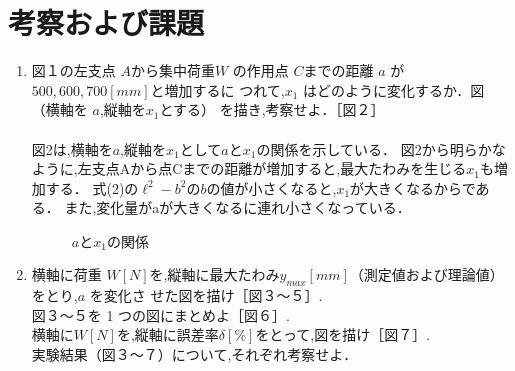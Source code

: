 \documentclass[a4paper,12pt]{jsarticle}
\begin{document}
\section{考察および課題}
\begin{enumerate}
  \item 図１の左支点 $A$から集中荷重$ W$ の作用点 $C $までの距離 $a$ が $500,600,700 [mm]$と増加するに
  つれて,$x_1$ はどのように変化するか．図（横軸を $a $,縦軸を$x_1$とする） を描き,考察せよ．［図２］\\
  \\
  \quad 図2は,横軸を$a$,縦軸を$x_1$として$a$と$x_1$の関係を示している．
  図2から明らかなように,左支点Aから点Cまでの距離が増加すると,最大たわみを生じる$x_1$も増加する．
  式(2)の$\ell^2-b^2$の$b$の値が小さくなると,$x_1$が大きくなるからである．
  また,変化量がaが大きくなるに連れ小さくなっている．

\clearpage
\begin{figure}[h]
  \centering
  \caption{$a$と$x_1$の関係}
\end{figure}
\clearpage

\item 横軸に荷重 $W [N] $を,縦軸に最大たわみ$ y_{max}[mm]$（測定値および理論値）をとり,$a$ を変化さ
せた図を描け［図３～５］.\\
図３～５を 1 つの図にまとめよ［図６］.\\
横軸に$ W [N]$を,縦軸に誤差率$ \delta [\%]$をとって,図を描け［図７］.\\
実験結果（図３～７）について,それぞれ考察せよ．\\
  

\end{enumerate}
\end{document}
